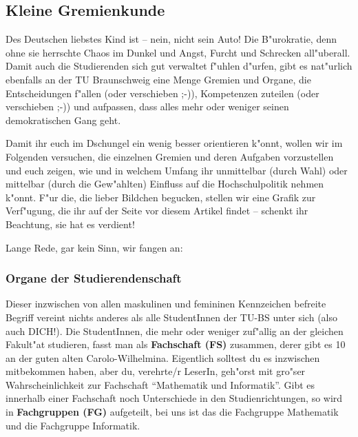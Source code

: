 \subsection{Kleine Gremienkunde}

Des Deutschen liebstes Kind ist -- nein, nicht sein Auto! Die B"urokratie, denn 
ohne sie herrschte Chaos im Dunkel und Angst, Furcht und Schrecken all"uberall. 
Damit auch die Studierenden sich gut verwaltet f"uhlen d"urfen, gibt es 
nat"urlich ebenfalls an der TU Braunschweig eine Menge Gremien und Organe, die 
Entscheidungen f"allen (oder verschieben ;-)), Kompetenzen zuteilen (oder 
verschieben ;-)) und aufpassen, dass alles mehr oder weniger seinen 
demokratischen Gang geht.


Damit ihr euch im Dschungel ein wenig besser orientieren k"onnt, wollen wir im 
Folgenden versuchen, die einzelnen Gremien und deren Aufgaben vorzustellen und 
euch zeigen, wie und in welchem Umfang ihr unmittelbar (durch Wahl) oder 
mittelbar (durch die Gew"ahlten) Einfluss auf die Hochschulpolitik nehmen 
k"onnt. F"ur die, die lieber Bildchen begucken, stellen wir eine Grafik zur 
Verf"ugung, die ihr auf der Seite vor diesem Artikel findet -- schenkt ihr 
Beachtung, sie hat es verdient!

Lange Rede, gar kein Sinn, wir fangen an:

\subsubsection*{Organe der Studierendenschaft}

Dieser inzwischen von allen maskulinen und femininen Kennzeichen befreite 
Begriff vereint nichts anderes als alle StudentInnen der TU-BS unter sich (also 
auch DICH!). Die StudentInnen, die mehr oder weniger zuf"allig an der gleichen 
Fakult"at studieren, fasst man als \textbf{Fachschaft (FS)} zusammen, derer 
gibt es 10 an der guten alten Carolo-Wilhelmina. Eigentlich solltest du es 
inzwischen mitbekommen haben, aber du, verehrte/r LeserIn, geh"orst mit gro"ser 
Wahrscheinlichkeit zur Fachschaft "`Mathematik und Informatik"'. Gibt es 
innerhalb einer Fachschaft noch Unterschiede in den Studienrichtungen, so wird 
in \textbf{Fachgruppen (FG)} aufgeteilt, bei uns ist das die Fachgruppe 
Mathematik und die Fachgruppe Informatik.

